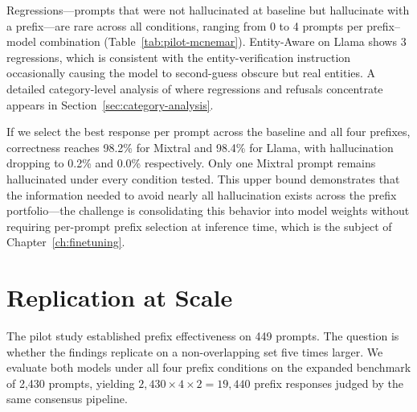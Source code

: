 Regressions---prompts that were not hallucinated at baseline but hallucinate with a prefix---are rare across all conditions, ranging from 0 to 4 prompts per prefix--model combination (Table~\ref{tab:pilot-mcnemar}). Entity-Aware on Llama shows 3 regressions, which is consistent with the entity-verification instruction occasionally causing the model to second-guess obscure but real entities. A detailed category-level analysis of where regressions and refusals concentrate appears in Section~\ref{sec:category-analysis}.

If we select the best response per prompt across the baseline and all four prefixes, correctness reaches 98.2\% for Mixtral and 98.4\% for Llama, with hallucination dropping to 0.2\% and 0.0\% respectively. Only one Mixtral prompt remains hallucinated under every condition tested. This upper bound demonstrates that the information needed to avoid nearly all hallucination exists across the prefix portfolio---the challenge is consolidating this behavior into model weights without requiring per-prompt prefix selection at inference time, which is the subject of Chapter~\ref{ch:finetuning}.

\section{Replication at Scale}
\label{sec:replication}

The pilot study established prefix effectiveness on 449 prompts. The question is whether the findings replicate on a non-overlapping set five times larger. We evaluate both models under all four prefix conditions on the expanded benchmark of 2,430 prompts, yielding $2{,}430 \times 4 \times 2 = 19{,}440$ prefix responses judged by the same consensus pipeline.

